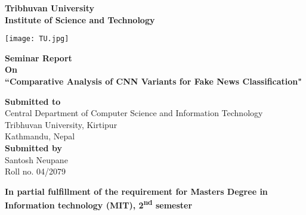 \begin{titlepage}
    \noindent  
    \begin{center}
        \large \textbf{Tribhuvan University}\\
        \large \textbf{Institute of Science and Technology}\\
        
        \vspace{0.9cm}
        
        \texttt{[image: TU.jpg]}\\
         
        \vspace{0.9cm}
        
        \large\textbf{Seminar Report} \\
        \textbf{On} \\
        \large \textbf{``Comparative Analysis of CNN Variants for Fake News Classification"}\\
        
        \vspace{0.9cm}
        
        \textbf{Submitted to}\\
        \large{ Central Department of Computer Science and Information Technology   \\
         Tribhuvan University, Kirtipur \\
         Kathmandu, Nepal}\\
         
        \vspace{0.9cm}
        \textbf{Submitted by}\\
        \large{Santosh Neupane \\ 
        Roll no. 04/2079}
        
        \vspace{0.9cm}
        
        \textbf{In partial fulfillment of the requirement for Masters Degree in Information technology (MIT), 2\textsuperscript{nd} semester}
    \end{center}
\end{titlepage}
\clearpage